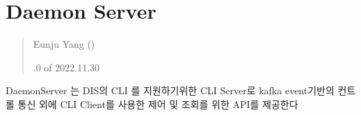 \documentclass[a4paper,10pt,english]{sphinxmanual}
\begin{document}
\sphinxstepscope


\section{Daemon Server}
\label{\detokenize{_daemonServer:daemon-server}}\label{\detokenize{_daemonServer:daemonserver}}\label{\detokenize{_daemonServer::doc}}\begin{quote}\begin{description}
\begin{DUlineblock}{0em}
\item[] Eunju Yang ()
\end{DUlineblock}

.0 of 2022.11.30

\end{description}\end{quote}

\sphinxAtStartPar
DaemonServer 는 DIS의 CLI 를 지원하기위한 CLI Server로 kafka event기반의 컨트롤 통신 외에
CLI Client를 사용한 제어 및 조회를 위한 API를 제공한다
\end{document}
